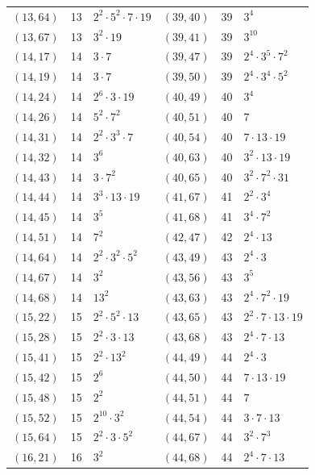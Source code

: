 \documentclass[11pt]{article}
\begin{document}
\begin{longtable}{@{}lrl@{\qquad}lrl@{}}
$(13,64)$ & 13 & $2^{2}\cdot 5^{2}\cdot 7\cdot 19$ & $(39,40)$ & 39 & $3^{4}$\\
$(13,67)$ & 13 & $3^{2}\cdot 19$ & $(39,41)$ & 39 & $3^{10}$\\
$(14,17)$ & 14 & $3\cdot 7$ & $(39,47)$ & 39 & $2^{4}\cdot 3^{5}\cdot 7^{2}$\\
$(14,19)$ & 14 & $3\cdot 7$ & $(39,50)$ & 39 & $2^{4}\cdot 3^{4}\cdot 5^{2}$\\
$(14,24)$ & 14 & $2^{6}\cdot 3\cdot 19$ & $(40,49)$ & 40 & $3^{4}$\\
$(14,26)$ & 14 & $5^{2}\cdot 7^{2}$ & $(40,51)$ & 40 & $7$\\
$(14,31)$ & 14 & $2^{2}\cdot 3^{3}\cdot 7$ & $(40,54)$ & 40 & $7\cdot 13\cdot 19$\\
$(14,32)$ & 14 & $3^{6}$ & $(40,63)$ & 40 & $3^{2}\cdot 13\cdot 19$\\
$(14,43)$ & 14 & $3\cdot 7^{2}$ & $(40,65)$ & 40 & $3^{2}\cdot 7^{2}\cdot 31$\\
$(14,44)$ & 14 & $3^{3}\cdot 13\cdot 19$ & $(41,67)$ & 41 & $2^{2}\cdot 3^{4}$\\
$(14,45)$ & 14 & $3^{5}$ & $(41,68)$ & 41 & $3^{4}\cdot 7^{2}$\\
$(14,51)$ & 14 & $7^{2}$ & $(42,47)$ & 42 & $2^{4}\cdot 13$\\
$(14,64)$ & 14 & $2^{2}\cdot 3^{2}\cdot 5^{2}$ & $(43,49)$ & 43 & $2^{4}\cdot 3$\\
$(14,67)$ & 14 & $3^{2}$ & $(43,56)$ & 43 & $3^{5}$\\
$(14,68)$ & 14 & $13^{2}$ & $(43,63)$ & 43 & $2^{4}\cdot 7^{2}\cdot 19$\\
$(15,22)$ & 15 & $2^{2}\cdot 5^{2}\cdot 13$ & $(43,65)$ & 43 & $2^{2}\cdot 7\cdot 13\cdot 19$\\
$(15,28)$ & 15 & $2^{2}\cdot 3\cdot 13$ & $(43,68)$ & 43 & $2^{4}\cdot 7\cdot 13$\\
$(15,41)$ & 15 & $2^{2}\cdot 13^{2}$ & $(44,49)$ & 44 & $2^{4}\cdot 3$\\
$(15,42)$ & 15 & $2^{6}$ & $(44,50)$ & 44 & $7\cdot 13\cdot 19$\\
$(15,48)$ & 15 & $2^{2}$ & $(44,51)$ & 44 & $7$\\
$(15,52)$ & 15 & $2^{10}\cdot 3^{2}$ & $(44,54)$ & 44 & $3\cdot 7\cdot 13$\\
$(15,64)$ & 15 & $2^{2}\cdot 3\cdot 5^{2}$ & $(44,67)$ & 44 & $3^{2}\cdot 7^{3}$\\
$(16,21)$ & 16 & $3^{2}$ & $(44,68)$ & 44 & $2^{4}\cdot 7\cdot 13$\\

\end{longtable}
\end{document}
